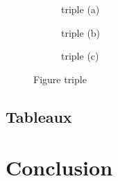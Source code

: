 \begin{figure}
	\centering
	\begin{subfigure}[b]{0.33\textwidth}
		\centering
		\def\svgwidth{\columnwidth}
		\fontsize{10pt}{10pt}\selectfont
		\caption{triple (a)}\label{fig:triple_a}
	\end{subfigure}
	\begin{subfigure}[b]{0.33\textwidth}
		\centering
		\def\svgwidth{\columnwidth}
		\fontsize{10pt}{10pt}\selectfont
		\caption{triple (b)}\label{fig:triple_b}
	\end{subfigure}
	\begin{subfigure}[b]{0.33\textwidth}
		\centering
		\def\svgwidth{\columnwidth}
		\fontsize{10pt}{10pt}\selectfont
		\caption{triple (c)}\label{fig:triple_c}
	\end{subfigure}
	\caption{Figure triple}\label{fig:triple_figure}
	
\end{figure}

\newpage 

\subsection{Tableaux}


\begin{table}
\centering
{}
\caption{Tableau}\label{tbl:Tableau}
\end{table} 

\section{Conclusion}
\label{sec:conclu1}

